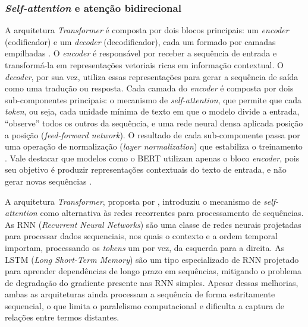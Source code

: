\documentclass[
    12pt,                %
    openright,           %
    oneside,             %
    a4paper,             %
    english,             %
    brazil               %
]{abntex2}
\begin{document}
\subsubsection{\textit{Self-attention} e atenção bidirecional}
\label{subsubsec:bert_attention}

A arquitetura \textit{Transformer} é composta por dois blocos principais: 
um \textit{encoder} (codificador) e um \textit{decoder} (decodificador), 
cada um formado por camadas empilhadas \cite{vaswani2017}. O \textit{encoder} 
é responsável por receber a sequência de entrada e transformá-la em 
representações vetoriais ricas em informação contextual. O \textit{decoder}, 
por sua vez, utiliza essas representações para gerar a sequência de saída como uma tradução ou resposta. Cada camada do \textit{encoder} é composta 
por dois sub-componentes principais: o mecanismo de \textit{self-attention}, 
que permite que cada \textit{token}, ou seja, cada unidade mínima de texto em que 
o modelo divide a entrada, ``observe'' todos os outros da sequência, 
e uma rede neural densa aplicada posição a posição (\textit{feed-forward 
network}). O resultado de cada sub-componente passa por uma operação de 
normalização (\textit{layer normalization}) que estabiliza o treinamento 
\cite{vaswani2017}. Vale destacar que modelos como o BERT utilizam apenas 
o bloco \textit{encoder}, pois seu objetivo é produzir representações 
contextuais do texto de entrada, e não gerar novas sequências \cite{devlin2019}.

A arquitetura \textit{Transformer}, proposta por , 
introduziu o mecanismo de \textit{self-attention} como alternativa às redes 
recorrentes para processamento de sequências. As RNN (\textit{Recurrent Neural 
Networks}) são uma classe de redes neurais 
projetadas para processar dados sequenciais, nos quais o contexto e a ordem 
temporal importam, processando os \textit{tokens} um por vez, da esquerda para 
a direita. As LSTM (\textit{Long Short-Term Memory}) são um tipo especializado 
de RNN projetado para aprender dependências de longo prazo em sequências, 
mitigando o problema de degradação do gradiente presente nas RNN simples. 
Apesar dessas melhorias, ambas as arquiteturas ainda processam a sequência de 
forma estritamente sequencial, o que limita o paralelismo computacional e 
dificulta a captura de relações entre termos distantes.
\end{document}
